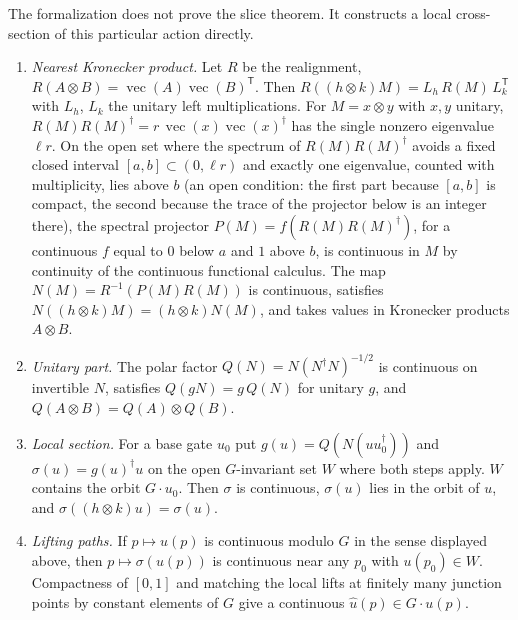 \documentclass{article}
\begin{document}
The formalization does not prove the slice theorem. It constructs a local
cross-section of this particular action directly.
\begin{enumerate}
    \item \emph{Nearest Kronecker product.} Let $R$ be the realignment,
          $R(A\otimes B)=\operatorname{vec}(A)\operatorname{vec}(B)^{\mathsf T}$.
          Then $R((h\otimes k)M)=L_h\,R(M)\,L_k^{\mathsf T}$ with $L_h$, $L_k$ the
          unitary left multiplications. For $M=x\otimes y$ with $x,y$ unitary,
          $R(M)R(M)^\dagger=r\,\operatorname{vec}(x)\operatorname{vec}(x)^\dagger$
          has the single nonzero eigenvalue $\ell r$. On the open set where the
          spectrum of $R(M)R(M)^\dagger$ avoids a fixed closed interval
          $[a,b]\subset(0,\ell r)$ and exactly one eigenvalue, counted with
          multiplicity, lies above $b$ (an open condition: the first part
          because $[a,b]$ is compact, the second because the trace of the
          projector below is an integer there), the
          spectral projector $P(M)=f(R(M)R(M)^\dagger)$, for a continuous $f$
          equal to $0$ below $a$ and $1$ above $b$, is continuous in $M$ by
          continuity of the continuous functional calculus. The map
          $N(M)=R^{-1}(P(M)R(M))$ is continuous, satisfies
          $N((h\otimes k)M)=(h\otimes k)N(M)$, and takes values in Kronecker
          products $A\otimes B$.
    \item \emph{Unitary part.} The polar factor
          $Q(N)=N(N^\dagger N)^{-1/2}$ is continuous on invertible $N$, satisfies
          $Q(gN)=g\,Q(N)$ for unitary $g$, and $Q(A\otimes B)=Q(A)\otimes Q(B)$.
    \item \emph{Local section.} For a base gate $u_0$ put
          $g(u)=Q(N(uu_0^\dagger))$ and $\sigma(u)=g(u)^\dagger u$ on the open
          $G$-invariant set $W$ where both steps apply. $W$ contains the orbit
          $G\cdot u_0$. Then $\sigma$ is continuous, $\sigma(u)$ lies in the
          orbit of $u$, and $\sigma((h\otimes k)u)=\sigma(u)$.
    \item \emph{Lifting paths.} If $p\mapsto u(p)$ is continuous modulo $G$ in
          the sense displayed above, then $p\mapsto\sigma(u(p))$ is continuous
          near any $p_0$ with $u(p_0)\in W$. Compactness of $[0,1]$ and
          matching the local lifts at finitely many junction points by constant
          elements of $G$ give a continuous $\hat u(p)\in G\cdot u(p)$.
\end{enumerate}
\end{document}
